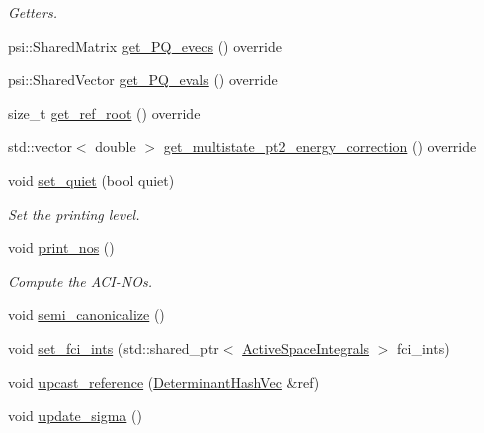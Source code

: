 \begin{DoxyCompactItemize}
\begin{DoxyCompactList}\small\item\em Getters. \end{DoxyCompactList}\item 
psi\+::\+Shared\+Matrix \mbox{\hyperlink{classforte_1_1_adaptive_c_i_ab96222faf4f633fac906b24c7b68d288}{get\+\_\+\+P\+Q\+\_\+evecs}} () override
\item 
psi\+::\+Shared\+Vector \mbox{\hyperlink{classforte_1_1_adaptive_c_i_ada31e72d787a94730002e80f0f93deca}{get\+\_\+\+P\+Q\+\_\+evals}} () override
\item 
size\+\_\+t \mbox{\hyperlink{classforte_1_1_adaptive_c_i_a770022fec5ed4819e58670155e7fd5fc}{get\+\_\+ref\+\_\+root}} () override
\item 
std\+::vector$<$ double $>$ \mbox{\hyperlink{classforte_1_1_adaptive_c_i_a56cd790d0780b1af0136341663204e41}{get\+\_\+multistate\+\_\+pt2\+\_\+energy\+\_\+correction}} () override
\item 
void \mbox{\hyperlink{classforte_1_1_adaptive_c_i_ab0d3dddc9c0f86906150f2f2bfef4937}{set\+\_\+quiet}} (bool quiet)
\begin{DoxyCompactList}\small\item\em Set the printing level. \end{DoxyCompactList}\item 
void \mbox{\hyperlink{classforte_1_1_adaptive_c_i_ae0264299d3ab2f38c68026ef91a8a5b6}{print\+\_\+nos}} ()
\begin{DoxyCompactList}\small\item\em Compute the A\+C\+I-\/\+N\+Os. \end{DoxyCompactList}\item 
void \mbox{\hyperlink{classforte_1_1_adaptive_c_i_ade019bc7c61b1817f68127cc0013066d}{semi\+\_\+canonicalize}} ()
\item 
void \mbox{\hyperlink{classforte_1_1_adaptive_c_i_a85d46f659801c5b3f9b558c265c90fa7}{set\+\_\+fci\+\_\+ints}} (std\+::shared\+\_\+ptr$<$ \mbox{\hyperlink{classforte_1_1_active_space_integrals}{Active\+Space\+Integrals}} $>$ fci\+\_\+ints)
\item 
void \mbox{\hyperlink{classforte_1_1_adaptive_c_i_ae4d307b8c98ae205056da0ab40585317}{upcast\+\_\+reference}} (\mbox{\hyperlink{classforte_1_1_determinant_hash_vec}{Determinant\+Hash\+Vec}} \&ref)
\item 
void \mbox{\hyperlink{classforte_1_1_adaptive_c_i_aa41514cfd2b49b8978196fc6991f6e3a}{update\+\_\+sigma}} ()
\end{DoxyCompactItemize}
